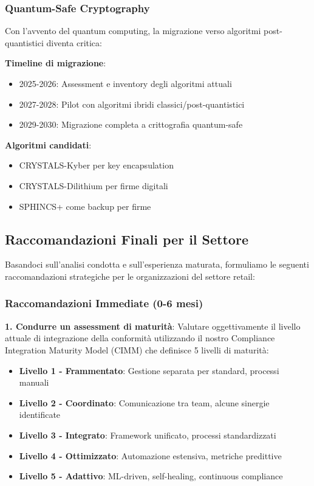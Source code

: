 \subsubsection{Quantum-Safe Cryptography}

Con l'avvento del quantum computing, la migrazione verso algoritmi post-quantistici diventa critica:

\textbf{Timeline di migrazione}:
\begin{itemize}
    \item 2025-2026: Assessment e inventory degli algoritmi attuali
    \item 2027-2028: Pilot con algoritmi ibridi classici/post-quantistici
    \item 2029-2030: Migrazione completa a crittografia quantum-safe
\end{itemize}

\textbf{Algoritmi candidati}:
\begin{itemize}
    \item CRYSTALS-Kyber per key encapsulation
    \item CRYSTALS-Dilithium per firme digitali
    \item SPHINCS+ come backup per firme
\end{itemize}

\subsection{Raccomandazioni Finali per il Settore}
\label{subsec:4.9.3_raccomandazioni}

Basandoci sull'analisi condotta e sull'esperienza maturata, formuliamo le seguenti raccomandazioni strategiche per le organizzazioni del settore retail:

\subsubsection{Raccomandazioni Immediate (0-6 mesi)}

\textbf{1. Condurre un assessment di maturità}:
Valutare oggettivamente il livello attuale di integrazione della conformità utilizzando il nostro Compliance Integration Maturity Model (CIMM) che definisce 5 livelli di maturità:

\begin{itemize}
    \item \textbf{Livello 1 - Frammentato}: Gestione separata per standard, processi manuali
    \item \textbf{Livello 2 - Coordinato}: Comunicazione tra team, alcune sinergie identificate
    \item \textbf{Livello 3 - Integrato}: Framework unificato, processi standardizzati
    \item \textbf{Livello 4 - Ottimizzato}: Automazione estensiva, metriche predittive
    \item \textbf{Livello 5 - Adattivo}: ML-driven, self-healing, continuous compliance
\end{itemize}

